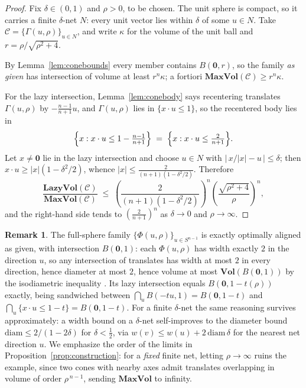 \documentclass[12pt]{article}
\theoremstyle{definition}
\newtheorem{remark}[theorem]{Remark}
\newcommand{\Sph}{S^{n-1}}
\newcommand{\Vol}{\mathbf{Vol}}
\newcommand{\MV}{\mathbf{MaxVol}}
\newcommand{\LV}{\mathbf{LazyVol}}
\begin{document}
\begin{proof}
Fix $\delta\in(0,1)$ and $\rho>0$, to be chosen.  The unit sphere is compact, so
it carries a finite $\delta$-net $N$: every unit vector lies within $\delta$ of
some $u\in N$.  Take $\mathcal{C}=\{\Gamma(u,\rho)\}_{u\in N}$, and write
$\kappa$ for the volume of the unit ball and $r=\rho/\sqrt{\rho^2+4}$.

By Lemma~\ref{lem:conebounds} every member contains $B(\mathbf 0,r)$, so the
family {\em as given} has intersection of volume at least $r^{n}\kappa$; a
fortiori $\MV(\mathcal{C})\ge r^{n}\kappa$.

For the lazy intersection, Lemma~\ref{lem:conebody} says recentering translates
$\Gamma(u,\rho)$ by $-\frac{n-1}{n+1}u$, and $\Gamma(u,\rho)$ lies in
$\{x\cdot u\le1\}$, so the recentered body lies in
\[
  \Bigl\{x:x\cdot u\le 1-\tfrac{n-1}{n+1}\Bigr\}
  \;=\;\Bigl\{x:x\cdot u\le\tfrac{2}{n+1}\Bigr\}.
\]
Let $x\ne\mathbf 0$ lie in the lazy intersection and choose $u\in N$ with
$\bigl|\,x/|x|-u\,\bigr|\le\delta$; then $x\cdot u\ge|x|(1-\delta^2/2)$, whence
$|x|\le\frac{2}{(n+1)(1-\delta^2/2)}$.  Therefore
\[
  \frac{\LV(\mathcal{C})}{\MV(\mathcal{C})}
  \;\le\;
  \left(\frac{2}{(n+1)(1-\delta^{2}/2)}\right)^{\!n}
  \left(\frac{\sqrt{\rho^{2}+4}}{\rho}\right)^{\!n},
\]
and the right-hand side tends to $\left(\tfrac{2}{n+1}\right)^{n}$ as
$\delta\to0$ and $\rho\to\infty$.
\end{proof}

\begin{remark}
The full-sphere family $\{\Phi(u,\rho)\}_{u\in\Sph}$ is exactly
optimally aligned as given, with intersection $B(\mathbf 0,1)$: each
$\Phi(u,\rho)$ has width exactly $2$ in the direction $u$, so any
intersection of translates has width at most $2$ in every direction,
hence diameter at most $2$, hence volume at most
$\Vol(B(\mathbf 0,1))$ by the isodiametric inequality
\cite[Theorem 3.2.3]{gardner}.  Its lazy intersection equals
$B(\mathbf 0,1-t(\rho))$ exactly, being sandwiched between
$\bigcap_u B(-t u,1)=B(\mathbf 0,1-t)$ and
$\bigcap_u\{x\cdot u\le 1-t\}=B(\mathbf 0,1-t)$.  For a finite
$\delta$-net the same reasoning survives approximately: a width bound
on a $\delta$-net self-improves to the diameter bound
$\mathrm{diam}\le 2/(1-2\delta)$ for $\delta<\tfrac12$, via
$w(v)\le w(u)+2\,\mathrm{diam}\,\delta$ for the nearest net direction
$u$.  We emphasize the order of the limits in
Proposition~\ref{prop:construction}: for a {\em fixed} finite net,
letting $\rho\to\infty$ ruins the example, since two cones with nearby axes
admit translates overlapping in volume of order $\rho^{\,n-1}$, sending
$\MV$ to infinity.
\end{remark}
\end{document}
